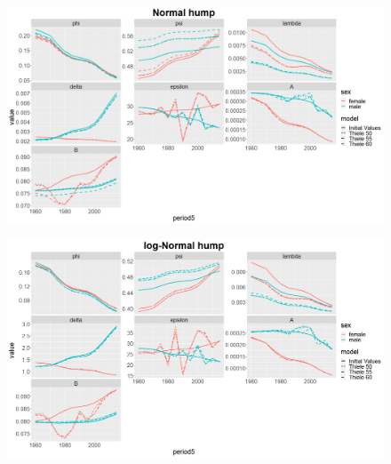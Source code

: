 \documentclass[12pt,a4paper]{article}
\begin{document}
\newpage
\begin{figure}[H]
\includegraphics[width = \linewidth]{par normal.png}
\end{figure}
\begin{figure}[H]
\includegraphics[width = \linewidth]{par log-normal.png}
\end{figure}
\end{document}

